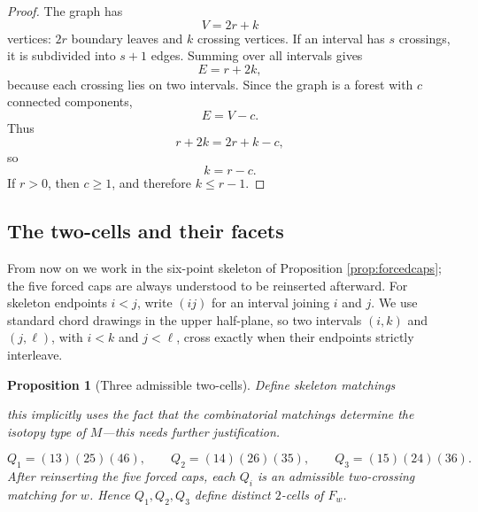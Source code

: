 \documentclass[12pt]{article}
\newtheorem{proposition}[theorem]{Proposition}
\theoremstyle{definition}
\newcommand{\review}[1]{\begin{reviewbox}#1\end{reviewbox}}
\begin{document}
\begin{proof}
The graph has
\[
V=2r+k
\]
vertices: \(2r\) boundary leaves and \(k\) crossing vertices.  If an interval has \(s\) crossings, it is subdivided into \(s+1\) edges.  Summing over all intervals gives
\[
E=r+2k,
\]
because each crossing lies on two intervals.  Since the graph is a forest with \(c\) connected components,
\[
E=V-c.
\]
Thus
\[
r+2k=2r+k-c,
\]
so
\[
k=r-c.
\]
If \(r>0\), then \(c\ge 1\), and therefore \(k\le r-1\).
\end{proof}

\subsection{The two-cells and their facets}

From now on we work in the six-point skeleton of Proposition \ref{prop:forcedcaps}; the five forced caps are always understood to be reinserted afterward.  For skeleton endpoints \(i<j\), write \((ij)\) for an interval joining \(i\) and \(j\).  We use standard chord drawings in the upper half-plane, so two intervals \((i,k)\) and \((j,\ell)\), with \(i<k\) and \(j<\ell\), cross exactly when their endpoints strictly interleave.

\begin{proposition}[Three admissible two-cells]\label{prop:twocells}
Define skeleton matchings
\review{this implicitly uses the fact that the combinatorial matchings determine the isotopy type of $M$---this needs further justification.}
\[
Q_1=(13)(25)(46),\qquad
Q_2=(14)(26)(35),\qquad
Q_3=(15)(24)(36).
\]
After reinserting the five forced caps, each \(Q_i\) is an admissible two-crossing matching for \(w\).  Hence \(Q_1,Q_2,Q_3\) define distinct \(2\)-cells of \(F_w\).
\end{proposition}
\end{document}
